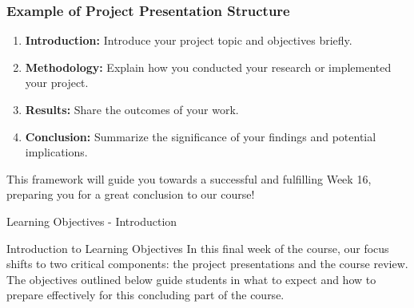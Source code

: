 \documentclass[aspectratio=169]{beamer}
\begin{document}
\begin{frame}[fragile]
    \frametitle{Example of Project Presentation Structure}
    \begin{enumerate}
        \item \textbf{Introduction:} Introduce your project topic and objectives briefly.
        \item \textbf{Methodology:} Explain how you conducted your research or implemented your project.
        \item \textbf{Results:} Share the outcomes of your work.
        \item \textbf{Conclusion:} Summarize the significance of your findings and potential implications.
    \end{enumerate}
    
    This framework will guide you towards a successful and fulfilling Week 16, preparing you for a great conclusion to our course!
\end{frame}

\begin{frame}[fragile]{Learning Objectives - Introduction}
  \begin{block}{Introduction to Learning Objectives}
    In this final week of the course, our focus shifts to two critical components: the project presentations and the course review. The objectives outlined below guide students in what to expect and how to prepare effectively for this concluding part of the course.
  \end{block}
\end{frame}
\end{document}
